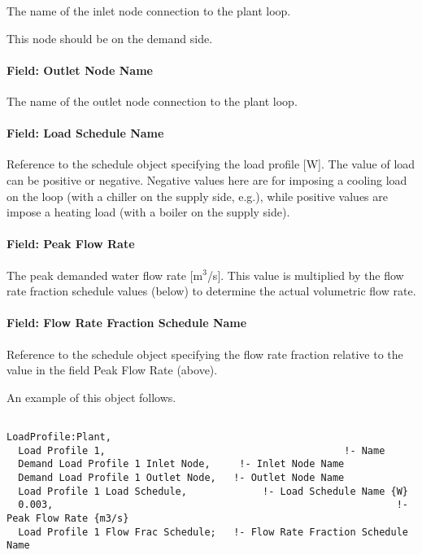 The name of the inlet node connection to the plant loop.

This node should be on the demand side.

\paragraph{Field: Outlet Node Name}\label{field-outlet-node-name-003}

The name of the outlet node connection to the plant loop.

\paragraph{Field: Load Schedule Name}\label{field-load-schedule-name}

Reference to the schedule object specifying the load profile {[}W{]}.  The value of load can be positive or negative.  Negative values here are for imposing a cooling load on the loop (with a chiller on the supply side, e.g.), while positive values are impose a heating load (with a boiler on the supply side).

\paragraph{Field: Peak Flow Rate}\label{field-peak-flow-rate}

The peak demanded water flow rate {[}m\(^{3}\)/s{]}. This value is multiplied by the flow rate fraction schedule values (below) to determine the actual volumetric flow rate.

\paragraph{Field: Flow Rate Fraction Schedule Name}\label{field-flow-rate-fraction-schedule-name}

Reference to the schedule object specifying the flow rate fraction relative to the value in the field Peak Flow Rate (above).

An example of this object follows.

\begin{lstlisting}

LoadProfile:Plant,
  Load Profile 1,                                         !- Name
  Demand Load Profile 1 Inlet Node,     !- Inlet Node Name
  Demand Load Profile 1 Outlet Node,   !- Outlet Node Name
  Load Profile 1 Load Schedule,             !- Load Schedule Name {W}
  0.003,                                                           !- Peak Flow Rate {m3/s}
  Load Profile 1 Flow Frac Schedule;   !- Flow Rate Fraction Schedule Name
\end{lstlisting}

